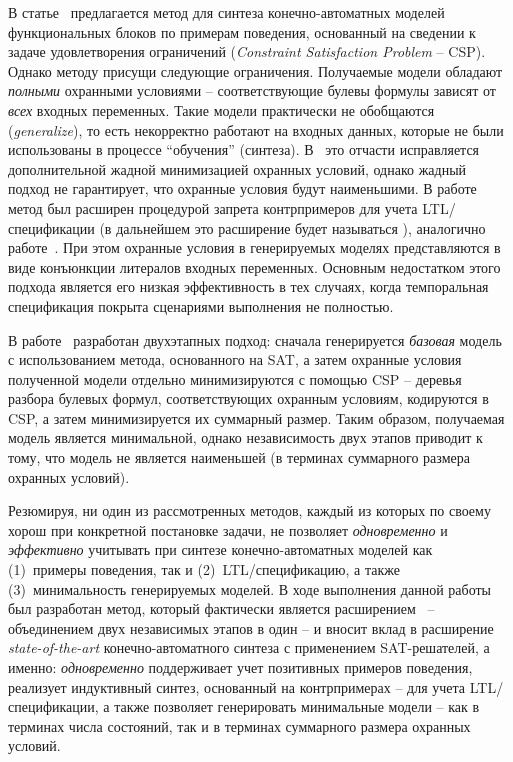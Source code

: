 В статье~\cite{fbCSP} предлагается метод  для синтеза конечно-автоматных моделей функциональных блоков по примерам поведения, основанный на сведении к задаче удовлетворения ограничений (\textit{Constraint Satisfaction Problem} \--- CSP).
Однако методу  присущи следующие ограничения.
Получаемые модели обладают \emph{полными} охранными условиями \--- соответствующие булевы формулы зависят от \emph{всех} входных переменных.
Такие модели практически не обобщаются (\textit{generalize}), то есть некорректно работают на входных данных, которые не были использованы в процессе \enquote{обучения} (синтеза).
В~\cite{fbCSP} это отчасти исправляется дополнительной жадной минимизацией охранных условий, однако жадный подход не гарантирует, что охранные условия будут наименьшими.
В работе~\cite{chivilikhin-18} метод  был расширен процедурой запрета контрпримеров для учета LTL\-/спецификации (в дальнейшем это расширение будет называться ), аналогично работе~\cite{efsm-tools}.
При этом охранные условия в генерируемых моделях представляются в виде конъюнкции литералов входных переменных.
Основным недостатком этого подхода является его низкая эффективность в тех случаях, когда темпоральная спецификация покрыта сценариями выполнения не полностью.

В работе~\cite{chivilikhin-19} разработан двухэтапных подход:
сначала генерируется \emph{базовая} модель с использованием метода, основанного на SAT, а затем охранные условия полученной модели отдельно минимизируются с помощью CSP \--- деревья разбора булевых формул, соответствующих охранным условиям, кодируются в CSP, а затем минимизируется их суммарный размер.
Таким образом, получаемая модель является минимальной, однако независимость двух этапов приводит к тому, что модель не является наименьшей (в терминах суммарного размера охранных условий).

Резюмируя, ни один из рассмотренных методов, каждый из которых по своему хорош при конкретной постановке задачи, не позволяет \emph{одновременно} и \emph{эффективно} учитывать при синтезе конечно-автоматных моделей как (1)~примеры поведения, так и (2)~LTL\-/спецификацию, а также (3)~минимальность генерируемых моделей.
В ходе выполнения данной работы был разработан метод, который фактически является расширением~\cite{chivilikhin-19} \--- объединением двух независимых этапов в один \--- и вносит вклад в расширение \textit{state-of-the-art} конечно-автоматного синтеза с применением SAT-решателей, а именно: \emph{одновременно} поддерживает учет позитивных примеров поведения, реализует индуктивный синтез, основанный на контрпримерах \--- для учета LTL\-/спецификации, а также позволяет генерировать минимальные модели \--- как в терминах числа состояний, так и в терминах суммарного размера охранных условий.

